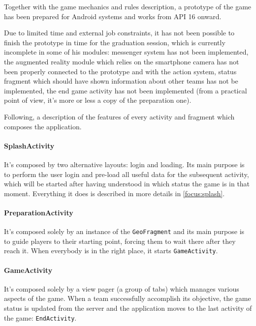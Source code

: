 		Together with the game mechanics and rules description, a prototype of the game has been prepared for Android systems and works from API 16 onward.
			
		Due to limited time and external job constraints, it has not been possible to finish the prototype in time for the graduation session, which is currently incomplete in some of his modules: messenger system has not been implemented, the augmented reality module which relies on the smartphone camera has not been properly connected to the prototype and with the action system, status fragment which should have shown information about other teams has not be implemented, the end game activity has not been implemented (from a practical point of view, it's more or less a copy of the preparation one).
		
		Following, a description of the features of every activity and fragment which composes the application.
		
		\paragraph{SplashActivity}
		
		It's composed by two alternative layouts: login and loading.
		Its main purpose is to perform the user login and pre-load all useful data for the subsequent activity, which will be started after having understood in which status the game is in that moment.
		Everything it does is described in more details in \autoref{focus:splash}.
		
		\paragraph{PreparationActivity}
		
		It's composed solely by an instance of the \lstinline|GeoFragment| and its main purpose is to guide players to their starting point, forcing them to wait there after they reach it. When everybody is in the right place, it starts \lstinline|GameActivity|.
		
		\paragraph{GameActivity}
			
		It's composed solely by a view pager (a group of tabs) which manages various aspects of the game.
		When a team successfully accomplish its objective, the game status is updated from the server and the application moves to the last activity of the game: \lstinline|EndActivity|.
		
